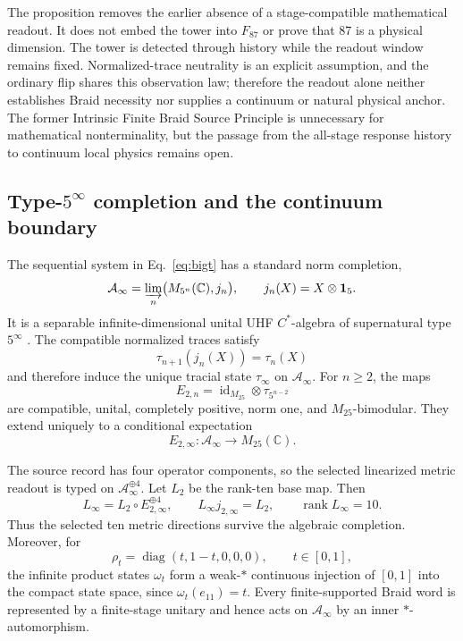 \documentclass[11pt]{article}
\theoremstyle{definition}
\theoremstyle{remark}
\newcommand{\cA}{\mathcal{A}}
\newcommand{\id}{\mathbf{1}}
\newcommand{\rank}{\operatorname{rank}}
\begin{document}
The proposition removes the earlier absence of a stage-compatible mathematical readout. It does not embed the tower into $F_{87}$ or prove that 87 is a physical dimension. The tower is detected through history while the readout window remains fixed. Normalized-trace neutrality is an explicit assumption, and the ordinary flip shares this observation law; therefore the readout alone neither establishes Braid necessity nor supplies a continuum or natural physical anchor. The former Intrinsic Finite Braid Source Principle is unnecessary for mathematical nonterminality, but the passage from the all-stage response history to continuum local physics remains open.

\subsection{\texorpdfstring{Type-$5^\infty$}{Type-5-infinity} completion and the continuum boundary}

The sequential system in Eq.~\eqref{eq:bigt} has a standard norm completion,
\begin{equation}\label{eq:uhf}
 \cA_\infty=\varinjlim_n\bigl(M_{5^n}(\mathbb C),j_n\bigr),
 \qquad j_n(X)=X\otimes\id_5.
\end{equation}
It is a separable infinite-dimensional unital UHF $C^*$-algebra of supernatural type $5^\infty$ \cite{brattellirobinson1997}. The compatible normalized traces satisfy
\begin{equation}
 \tau_{n+1}(j_n(X))=\tau_n(X)
\end{equation}
and therefore induce the unique tracial state $\tau_\infty$ on $\cA_\infty$. For $n\ge2$, the maps
\begin{equation}
 E_{2,n}=\operatorname{id}_{M_{25}}\otimes\tau_{5^{n-2}}
\end{equation}
are compatible, unital, completely positive, norm one, and $M_{25}$-bimodular. They extend uniquely to a conditional expectation
\begin{equation}
 E_{2,\infty}:\cA_\infty\longrightarrow M_{25}(\mathbb C).
\end{equation}

The source record has four operator components, so the selected linearized metric readout is typed on $\cA_\infty^{\oplus4}$. Let $L_2$ be the rank-ten base map. Then
\begin{equation}
 L_\infty=L_2\circ E_{2,\infty}^{\oplus4},
 \qquad L_\infty j_{2,\infty}=L_2,
 \qquad \rank L_\infty=10.
\end{equation}
Thus the selected ten metric directions survive the algebraic completion. Moreover, for
\begin{equation}
 \rho_t=\operatorname{diag}(t,1-t,0,0,0),\qquad t\in[0,1],
\end{equation}
the infinite product states $\omega_t$ form a weak-$*$ continuous injection of $[0,1]$ into the compact state space, since $\omega_t(e_{11})=t$. Every finite-supported Braid word is represented by a finite-stage unitary and hence acts on $\cA_\infty$ by an inner $*$-automorphism.
\end{document}
